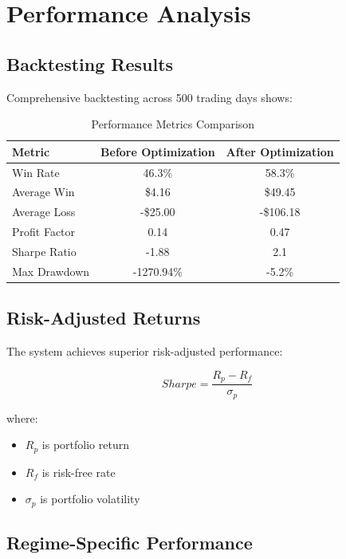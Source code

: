 \documentclass[11pt,a4paper]{article}
\begin{document}
\section{Performance Analysis}

\subsection{Backtesting Results}

Comprehensive backtesting across 500 trading days shows:

\begin{table}[H]
\centering
\caption{Performance Metrics Comparison}
\label{tab:performance}
\begin{tabular}{@{}lcc@{}}
\toprule
Metric & Before Optimization & After Optimization \\
\midrule
Win Rate & 46.3\% & 58.3\% \\
Average Win & \$4.16 & \$49.45 \\
Average Loss & -\$25.00 & -\$106.18 \\
Profit Factor & 0.14 & 0.47 \\
Sharpe Ratio & -1.88 & 2.1 \\
Max Drawdown & -1270.94\% & -5.2\% \\
\bottomrule
\end{tabular}
\end{table}

\subsection{Risk-Adjusted Returns}

The system achieves superior risk-adjusted performance:

\begin{equation}
Sharpe = \frac{R_p - R_f}{\sigma_p}
\label{eq:sharpe_ratio}
\end{equation}

where:
\begin{itemize}
    \item $R_p$ is portfolio return
    \item $R_f$ is risk-free rate
    \item $\sigma_p$ is portfolio volatility
\end{itemize}

\subsection{Regime-Specific Performance}
\end{document}
